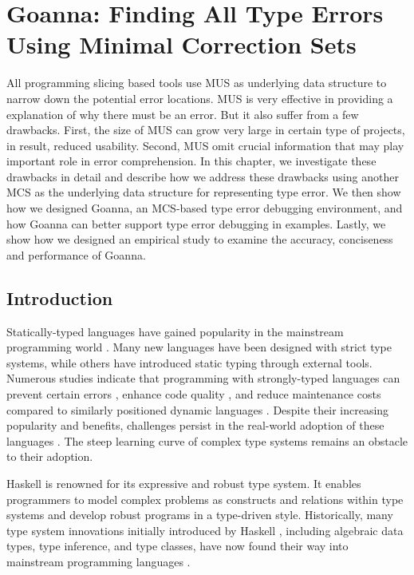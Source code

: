 
\chapter{Goanna: Finding All Type Errors Using Minimal Correction Sets} 

\label{chap:goanna} 
\graphicspath{{Figures/Goanna}}

All programming slicing based tools use MUS as underlying data structure to narrow down the potential error locations. MUS is very effective in providing a explanation of why there must be an error. But it also suffer from a few drawbacks. First, the size of MUS can grow very large in certain type of projects, in result, reduced usability. Second, MUS omit crucial information that may play important role in error comprehension. In this chapter, we investigate these drawbacks in detail and describe how we address these drawbacks using another MCS as the underlying data structure for representing type error. We then show how we designed Goanna, an MCS-based type error debugging environment, and how Goanna can better support type error debugging in examples. Lastly, we show how we designed an empirical study to examine the accuracy, conciseness and performance of Goanna.


\section{Introduction} \label{sec:introduction}
    
Statically-typed languages have gained popularity in the mainstream programming world \cite{StackOverflow2022-aw}. Many new languages have been designed with strict type systems, while others have introduced static typing through external tools. Numerous studies indicate that programming with strongly-typed languages can prevent certain errors \cite{Bogner2022-vf}, enhance code quality \cite{Mayer2012-lg}, and reduce maintenance costs \cite{Kleinschmager2012-bg} compared to similarly positioned dynamic languages \cite{Bogner2022-vf}. Despite their increasing popularity and benefits, challenges persist in the real-world adoption of these languages \cite{Zeng2019-ou}. The steep learning curve of complex type systems remains an obstacle to their adoption. 

Haskell is renowned for its expressive and robust type system. It enables programmers to model complex problems as constructs and relations within type systems and develop robust programs in a type-driven style. Historically, many type system innovations initially introduced by Haskell \cite{Hudak2007-kn}, including algebraic data types, type inference, and type classes, have now found their way into mainstream programming languages \cite{TypeScriptTeam_undated-qk,Klabnik_undated-mp,Griesemer_undated-ff}.
    
